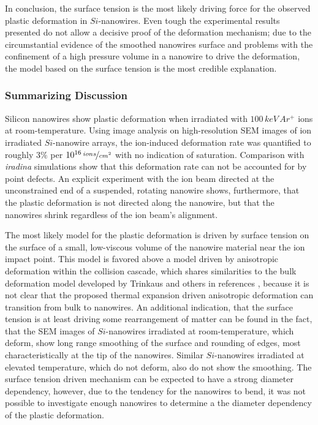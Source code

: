 In conclusion, the surface tension is the most likely driving force for the observed plastic deformation in $Si$-nanowires. Even tough the experimental results presented do not allow a decisive proof of the deformation mechanism; due to the circumstantial evidence of the smoothed nanowires surface and problems with the confinement of a high pressure volume in a nanowire to drive the deformation, the model based on the surface tension is the most credible explanation.

\subsubsection{Summarizing Discussion}

Silicon nanowires show plastic deformation when irradiated with $100\,keV\,Ar^+$ ions at room-temperature. Using image analysis on high-resolution SEM images of ion irradiated $Si$-nanowire arrays, the ion-induced deformation rate was quantified to roughly $3\%$ per $10^{16}\,\nicefrac{ions}{cm^2}$ with no indication of saturation. Comparison with \emph{iradina} simulations show that this deformation rate can not be accounted for by point defects. An explicit experiment with the ion beam directed at the unconstrained end of a suspended, rotating nanowire shows, furthermore, that the plastic deformation is not directed along the nanowire, but that the nanowires shrink regardless of the ion beam's alignment.

The most likely model for the plastic deformation is driven by surface tension on the surface of a small, low-viscous volume of the nanowire material near the ion impact point. This model is favored above a model driven by anisotropic deformation within the collision cascade, which shares similarities to the bulk deformation model developed by Trinkaus and others in references \cite{trinkaus_viscoelastic_1995,baumer_prediction_2014}, because it is not clear that the proposed thermal expansion driven anisotropic deformation can transition from bulk to nanowires. An additional indication, that the surface tension is at least driving some rearrangement of matter can be found in the fact, that the SEM images of $Si$-nanowires irradiated at room-temperature, which deform, show long range smoothing of the surface and rounding of edges, most characteristically at the tip of the nanowires. Similar $Si$-nanowires irradiated at elevated temperature, which do not deform, also do not show the smoothing. The surface tension driven mechanism can be expected to have a strong diameter dependency, however, due to the tendency for the nanowires to bend, it was not possible to investigate enough nanowires to determine a the diameter dependency of the plastic deformation. 





